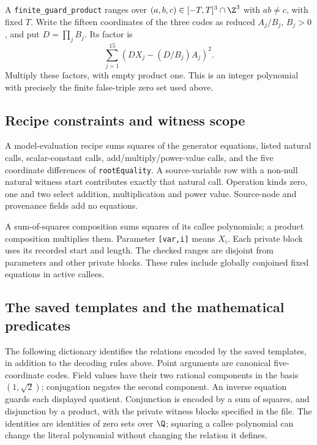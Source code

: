 A \texttt{finite\_guard\_product} ranges over
$(a,b,c)\in[-T,T]^3\cap\Z^3$ with $ab\ne c$, with fixed $T$.
Write the fifteen coordinates of the three codes as reduced
$A_j/B_j$, $B_j>0$, and put $D=\prod_jB_j$. Its factor is
\[
                 \sum_{j=1}^{15}(DX_j-(D/B_j)A_j)^2.
\]
Multiply these factors, with empty product one. This is an integer
polynomial with precisely the finite false-triple zero set used above.

\subsection{Recipe constraints and witness scope}
A model-evaluation recipe sums squares of the generator equations,
listed natural calls, scalar-constant calls, add/multiply/power-value calls,
and the five coordinate differences of \texttt{rootEquality}.
A source-variable row with a non-null natural witness start contributes
exactly that natural call. Operation kinds zero, one and two select
addition, multiplication and power value. Source-node and provenance
fields add no equations.

A sum-of-squares composition sums squares of its callee polynomials;
a product composition multiplies them. Parameter \texttt{[var,i]} means
$X_i$. Each private block uses its recorded start and length.
The checked ranges are disjoint from parameters and other private blocks.
These rules include globally conjoined fixed equations in active callees.

\subsection{The saved templates and the mathematical predicates}
\label{subsec:v10-template-dictionary}
The following dictionary identifies the relations encoded by the saved
templates, in addition to the decoding rules above. Point arguments are
canonical five-coordinate codes. Field values have their two rational
components in the basis $(1,\sqrt2)$; conjugation negates the second
component. An inverse equation guards each displayed quotient.
Conjunction is encoded by a sum of squares, and disjunction by a
product, with the private witness blocks specified in the file.
The identities are identities of zero sets over $\Q$; squaring a
callee polynomial can change the literal polynomial without changing
the relation it defines.

